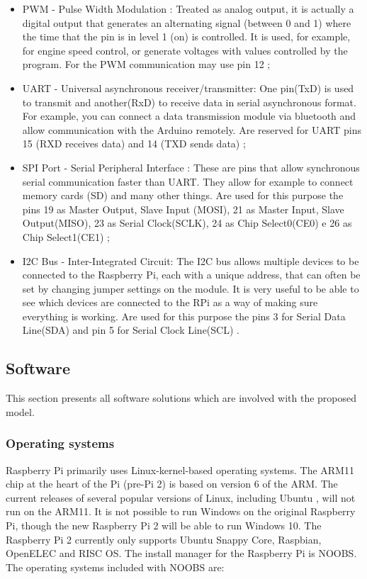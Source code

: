 \documentclass{acm_proc_article-sp}
\begin{document}
\begin{itemize}

\item PWM - Pulse Width Modulation : Treated as analog output, it is actually a digital output that generates an alternating signal (between 0 and 1) where the time that the pin is in level 1 (on) is controlled. It is used, for example, for engine speed control, or generate voltages with values controlled by the program. For the PWM communication may use pin 12 \cite{barr2001pulse};

\item UART - Universal asynchronous receiver/transmitter: One pin(TxD) is used to transmit and another(RxD) to receive data in serial asynchronous format. For example, you can connect a data transmission module via bluetooth and allow communication with the Arduino remotely. Are reserved for UART pins 15 (RXD receives data) and 14 (TXD sends data) \cite{Uart};

\item SPI Port - Serial Peripheral Interface : These are pins that allow synchronous serial communication faster than UART. They allow for example to connect memory cards (SD) and many other things. Are used for this purpose the pins 19 as Master Output, Slave Input (MOSI), 21 as Master Input, Slave Output(MISO), 23 as Serial Clock(SCLK), 24 as Chip Select0(CE0) e 26 as Chip Select1(CE1) \cite{Spi};


\item I2C Bus - Inter-Integrated Circuit: The I2C bus allows multiple devices to be connected to the Raspberry Pi, each with a unique address, that can often be set by changing jumper settings on the module. It is very useful to be able to see which devices are connected to the RPi as a way of making sure everything is working. Are used for this purpose the pins 3 for Serial Data Line(SDA) and pin 5 for Serial Clock Line(SCL) \cite{I2c}.

\end{itemize}

\subsection{Software}
This section presents all software solutions which are involved with the proposed model.

\subsubsection{Operating systems}
Raspberry Pi primarily uses Linux-kernel-based operating systems. The ARM11 chip at the heart of the Pi (pre-Pi 2) is based on version 6 of the ARM. The current releases of several popular versions of Linux, including Ubuntu \cite{Gareth}, will not run on the ARM11. It is not possible to run Windows on the original Raspberry Pi, though the new Raspberry Pi 2 will be able to run Windows 10\cite{Kevin}. The Raspberry Pi 2 currently only supports Ubuntu Snappy Core, Raspbian, OpenELEC and RISC OS.
\newline
\newline
The install manager for the Raspberry Pi is NOOBS. The operating systems included with NOOBS are:
\end{document}

